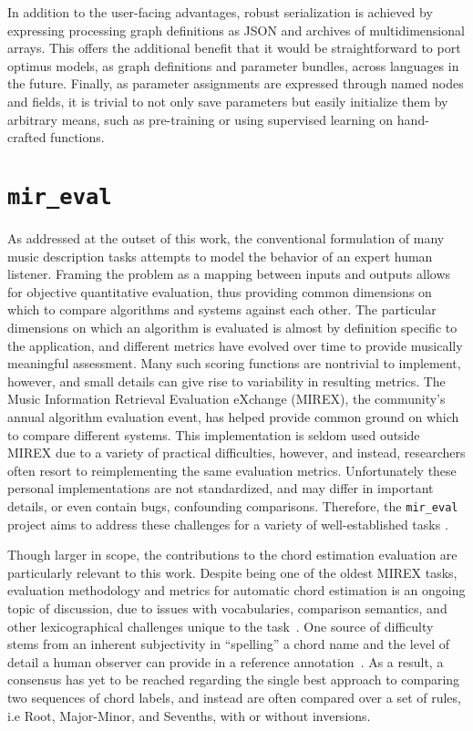 In addition to the user-facing advantages, robust serialization is achieved by expressing processing graph definitions as JSON and archives of multidimensional arrays.
This offers the additional benefit that it would be straightforward to port optimus models, as graph definitions and parameter bundles, across languages in the future.
Finally, as parameter assignments are expressed through named nodes and fields, it is trivial to not only save parameters but easily initialize them by arbitrary means, such as pre-training or using supervised learning on hand-crafted functions.


\section{\texttt{mir\_eval}}
\label{sec:mir_eval}

As addressed at the outset of this work, the conventional formulation of many music description tasks attempts to model the behavior of an expert human listener.
Framing the problem as a mapping between inputs and outputs allows for objective quantitative evaluation, thus providing common dimensions on which to compare algorithms and systems against each other.
The particular dimensions on which an algorithm is evaluated is almost by definition specific to the application, and different metrics have evolved over time to provide musically meaningful assessment.
Many such scoring functions are nontrivial to implement, however, and small details can give rise to variability in resulting metrics.
The Music Information Retrieval Evaluation eXchange (MIREX), the community's annual algorithm evaluation event, has helped provide common ground on which to compare different systems.
This implementation is seldom used outside MIREX due to a variety of practical difficulties, however, and instead, researchers often resort to reimplementing the same evaluation metrics.
Unfortunately these personal implementations are not standardized, and may differ in important details, or even contain bugs, confounding comparisons.
Therefore, the \texttt{mir\_eval} project aims to address these challenges for a variety of well-established tasks \cite{Raffel2014Eval}.


Though larger in scope, the contributions to the chord estimation evaluation are particularly relevant to this work.
Despite being one of the oldest MIREX tasks, evaluation methodology and metrics for automatic chord estimation is an ongoing topic of discussion, due to issues with vocabularies, comparison semantics, and other lexicographical challenges unique to the task~\cite{Pauwels2013Evaluating}.
One source of difficulty stems from an inherent subjectivity in ``spelling'' a chord name and the level of detail a human observer can provide in a reference annotation~\cite{Ni2013Understanding}.
As a result, a consensus has yet to be reached regarding the single best approach to comparing two sequences of chord labels, and instead are often compared over a set of rules, i.e Root, Major-Minor, and Sevenths, with or without inversions.

